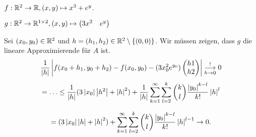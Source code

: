 \documentclass[../ana2u.tex]{subfiles}
\begin{document}
\begin{bsp}
    \( f:\mathbb{R}^2\rightarrow \mathbb{R}, (x,y) \mapsto x^3 + e^y \).
    \begin{beh}
        \( g:\mathbb{R}^2\rightarrow \mathbb{R}^{1\times 2}, (x,y) \mapsto \begin{pmatrix}
            3x^2 & e^y
        \end{pmatrix} \)
    \end{beh}
    \begin{bew}
        Sei \( (x_0, y_0) \in \mathbb{R}^2 \) und 
        \( h = (h_1, h_2) \in \mathbb{R}^2 \setminus \{(0,0)\} \).
        Wir müssen zeigen, dass \( g \) die lineare Approximierende 
        für \(A\) ist.
        \[ \frac{1}{\left|h\right|} \left|f(x_0 + h_1, y_0 + h_2) - f(x_0, y_0) - (3x_0^2 e^{y_0})\begin{pmatrix}
            h1 \\
            h2
        \end{pmatrix}\right| \overset{!}{\underset{h \rightarrow 0}{\longrightarrow}} 0 \]
        \[ = \ldots 
        \leq \frac{1}{\left|h\right|} (3 \left|x_0\right| \left|h^2\right| + \left|h\right|^2) 
        + \frac{1}{\left|h\right|} \sum_{k=1}^\infty \sum_{l=2}^k \binom{k}{l} 
        \frac{\left| y_0 \right|^{k-l}}{k!} \left|h\right|^l \]

        \[ = (3\left|x_0\right|\left|h\right| + \left|h\right|^2) + 
        \sum_{k=1}^\infty \sum_{l=2}^k \binom{k}{l} 
        \frac{\left| y_0 \right|^{k-l}}{k!} \left|h\right|^{l-1} \rightarrow 0. \]
    \end{bew}
\end{bsp}
\end{document}
